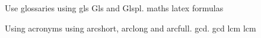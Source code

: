 \documentclass{article}
\begin{document}
Use glossaries using gls Gls and Glspl.
\gls{maths} \Gls{latex} \Glspl{formula}


Using acronyms using arcshort, arclong and arcfull.
 \acrshort{gcd}. \acrlong{gcd}
 \acrshort{lcm} \acrfull{lcm}





\printglossary[type=main,style=long,nonumberlist] %
\end{document}
